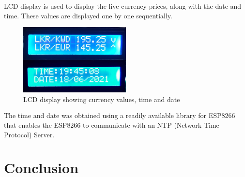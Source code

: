 LCD display is used to display the live currency prices, along with the date and time. These values are displayed one by one sequentially.


\begin{figure}[H]
    \centering
      \includegraphics[width=0.5\textwidth]{images/lcd.png}
    \caption{LCD display showing currency values, time and date}
    \label{lcd}
\end{figure}



The time and date was obtained using a readily available library for ESP8266 that enables the ESP8266 to communicate with an NTP (Network Time Protocol) Server.


\section{Conclusion}

